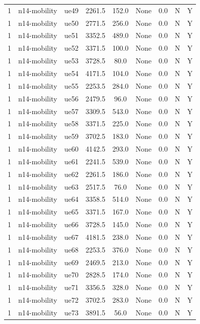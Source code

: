 \begin{table}[ht]
\begin{tabular}{|c|c|c|c|c|c|c|c|c|}
1 & n14-mobility & ue49 & 2261.5 & 152.0 & None & 0.0 & N & Y \\
1 & n14-mobility & ue50 & 2771.5 & 256.0 & None & 0.0 & N & Y \\
1 & n14-mobility & ue51 & 3352.5 & 489.0 & None & 0.0 & N & Y \\
1 & n14-mobility & ue52 & 3371.5 & 100.0 & None & 0.0 & N & Y \\
1 & n14-mobility & ue53 & 3728.5 & 80.0 & None & 0.0 & N & Y \\
1 & n14-mobility & ue54 & 4171.5 & 104.0 & None & 0.0 & N & Y \\
1 & n14-mobility & ue55 & 2253.5 & 284.0 & None & 0.0 & N & Y \\
1 & n14-mobility & ue56 & 2479.5 & 96.0 & None & 0.0 & N & Y \\
1 & n14-mobility & ue57 & 3309.5 & 543.0 & None & 0.0 & N & Y \\
1 & n14-mobility & ue58 & 3371.5 & 225.0 & None & 0.0 & N & Y \\
1 & n14-mobility & ue59 & 3702.5 & 183.0 & None & 0.0 & N & Y \\
1 & n14-mobility & ue60 & 4142.5 & 293.0 & None & 0.0 & N & Y \\
1 & n14-mobility & ue61 & 2241.5 & 539.0 & None & 0.0 & N & Y \\
1 & n14-mobility & ue62 & 2261.5 & 186.0 & None & 0.0 & N & Y \\
1 & n14-mobility & ue63 & 2517.5 & 76.0 & None & 0.0 & N & Y \\
1 & n14-mobility & ue64 & 3358.5 & 514.0 & None & 0.0 & N & Y \\
1 & n14-mobility & ue65 & 3371.5 & 167.0 & None & 0.0 & N & Y \\
1 & n14-mobility & ue66 & 3728.5 & 145.0 & None & 0.0 & N & Y \\
1 & n14-mobility & ue67 & 4181.5 & 238.0 & None & 0.0 & N & Y \\
1 & n14-mobility & ue68 & 2253.5 & 376.0 & None & 0.0 & N & Y \\
1 & n14-mobility & ue69 & 2469.5 & 213.0 & None & 0.0 & N & Y \\
1 & n14-mobility & ue70 & 2828.5 & 174.0 & None & 0.0 & N & Y \\
1 & n14-mobility & ue71 & 3356.5 & 328.0 & None & 0.0 & N & Y \\
1 & n14-mobility & ue72 & 3702.5 & 283.0 & None & 0.0 & N & Y \\
1 & n14-mobility & ue73 & 3891.5 & 56.0 & None & 0.0 & N & Y \\

\end{tabular}
\end{table}
